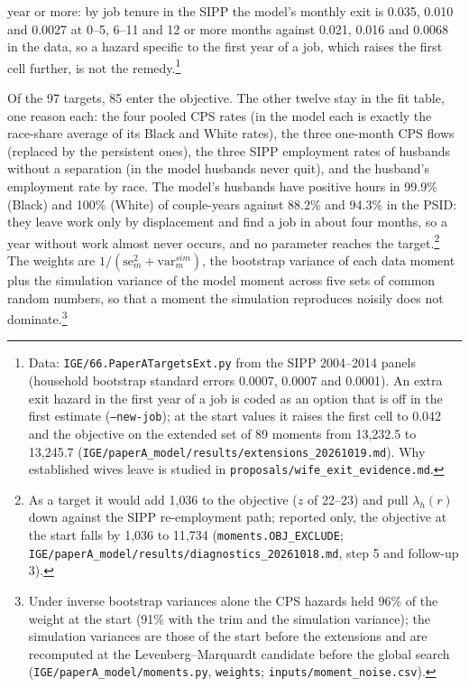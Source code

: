 year or more: by job tenure in the SIPP the model's monthly exit is 0.035, 0.010 and 0.0027 at 0--5, 6--11 and 12 or
more months against 0.021, 0.016 and 0.0068 in the data, so a hazard specific to the first year of a job, which raises
the first cell further, is not the remedy.\footnote{Data: \texttt{IGE/66.PaperATargetsExt.py} from the SIPP
2004--2014 panels (household bootstrap standard errors 0.0007, 0.0007 and 0.0001). An extra exit hazard in the first
year of a job is coded as an option that is off in the first estimate (\texttt{--new-job}); at the start values it
raises the first cell to 0.042 and the objective on the extended set of 89 moments from 13{,}232.5 to 13{,}245.7
(\texttt{IGE/paperA\_model/results/extensions\_20261019.md}). Why established wives leave is studied in
\texttt{proposals/wife\_exit\_evidence.md}.}

Of the 97 targets, 85 enter the objective. The other twelve stay in the fit table, one reason each: the four pooled CPS
rates (in the model each is exactly the race-share average of its Black and White rates), the three one-month CPS flows
(replaced by the persistent ones), the three SIPP employment rates of husbands without a separation (in the model
husbands never quit), and the husband's employment rate by race. The model's husbands have positive hours in 99.9\%
(Black) and 100\% (White) of couple-years against 88.2\% and 94.3\% in the PSID: they leave work only by displacement and
find a job in about four months, so a year without work almost never occurs, and no parameter reaches the
target.\footnote{As a target it would add 1{,}036 to the objective ($z$ of 22--23) and pull $\lambda_h(r)$ down against
the SIPP re-employment path; reported only, the objective at the start falls by 1{,}036 to 11{,}734
(\texttt{moments.OBJ\_EXCLUDE}; \texttt{IGE/paperA\_model/results/diagnostics\_20261018.md}, step 5 and follow-up 3).}
The weights are $1/(\mathrm{se}_m^2 + \mathrm{var}^{sim}_m)$, the bootstrap variance of each data moment plus the
simulation variance of the model moment across five sets of common random numbers, so that a moment the simulation
reproduces noisily does not dominate.\footnote{Under inverse bootstrap variances alone the CPS hazards held 96\% of the
weight at the start (91\% with the trim and the simulation variance); the simulation variances are those of the start
before the extensions and are recomputed at the Levenberg--Marquardt candidate before the global search
(\texttt{IGE/paperA\_model/moments.py}, \texttt{weights}; \texttt{inputs/moment\_noise.csv}).}


